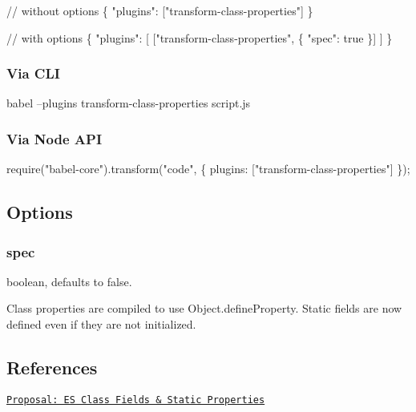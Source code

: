 \begin{DoxyCode}
// without options
\{
  "plugins": ["transform-class-properties"]
\}

// with options
\{
  "plugins": [
    ["transform-class-properties", \{ "spec": true \}]
  ]
\}
\end{DoxyCode}


\subsubsection*{Via C\+LI}


\begin{DoxyCode}
babel --plugins transform-class-properties script.js
\end{DoxyCode}


\subsubsection*{Via Node A\+PI}


\begin{DoxyCode}
require("babel-core").transform("code", \{
  plugins: ["transform-class-properties"]
\});
\end{DoxyCode}


\subsection*{Options}

\subsubsection*{{\ttfamily spec}}

{\ttfamily boolean}, defaults to {\ttfamily false}.

Class properties are compiled to use {\ttfamily Object.\+define\+Property}. Static fields are now defined even if they are not initialized.

\subsection*{References}


\begin{DoxyItemize}
\item \href{https://github.com/jeffmo/es-class-static-properties-and-fields}{\tt Proposal\+: ES Class Fields \& Static Properties} 
\end{DoxyItemize}